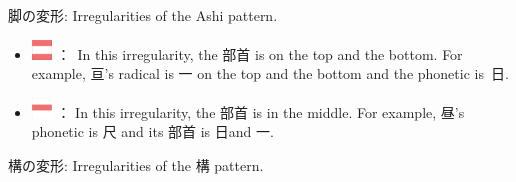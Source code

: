 \begin{center}
 脚の変形: Irregularities of the Ashi pattern. 
\end{center}

\begin{itemize}

\item 
\includegraphics[scale=0.5]{figs/第08章/第359課:_the214bushu_fig/20px_Busyu___ashi(2).png}
 ： In this irregularity, the 部首 is on the top and the bottom. For example, 亘's radical is 一 on the top and the bottom and the phonetic is 日. 
\item 
\includegraphics[scale=0.5]{figs/第08章/第359課:_the214bushu_fig/20px_Busyu___ashi(3).png}
 ： In this irregularity, the 部首 is in the middle. For example, 昼's phonetic is 尺 and its 部首 is 日and 一. 
\end{itemize}

\begin{center}
 構の変形: Irregularities of the 構 pattern. 
\end{center}

